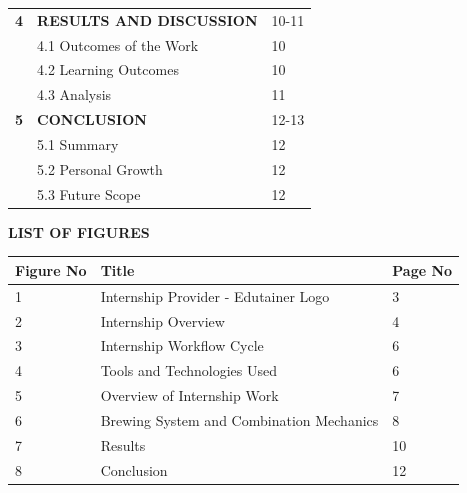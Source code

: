 \documentclass[15pt,a4paper,twocolumn,fleqn]{article}
\begin{document}
\thispagestyle{numbered}
\begin{center}
\begin{tabular}{p{3.5cm} p{9cm} p{2.5cm}}

\textbf{4} & \textbf{RESULTS AND DISCUSSION} & 10-11 \\
& 4.1 Outcomes of the Work & 10 \\
& 4.2 Learning Outcomes & 10 \\
& 4.3 Analysis & 11 \\

\textbf{5} & \textbf{CONCLUSION} & 12-13 \\
& 5.1 Summary & 12 \\
& 5.2 Personal Growth & 12 \\
& 5.3 Future Scope & 12 \\

\end{tabular}
\end{center}


\newpage
\thispagestyle{numbered}
\begin{center}
{\Large \textbf{LIST OF FIGURES}}\\[0.4cm]
\end{center}

\renewcommand{\arraystretch}{1.1}
\setlength{\tabcolsep}{4pt}

\begin{center}
\begin{tabular}{p{3.5cm} p{9cm} p{2.5cm}}
\textbf{Figure No} & \textbf{Title} & \textbf{Page No} \\
\hline

1 & Internship Provider - Edutainer Logo & 3 \\
2 & Internship Overview & 4 \\
3 & Internship Workflow Cycle & 6 \\
4 & Tools and Technologies Used & 6 \\
5 & Overview of Internship Work & 7 \\
6 & Brewing System and Combination Mechanics & 8 \\
7 & Results & 10 \\
8 & Conclusion & 12 \\

\end{tabular}
\end{center}
\end{document}
